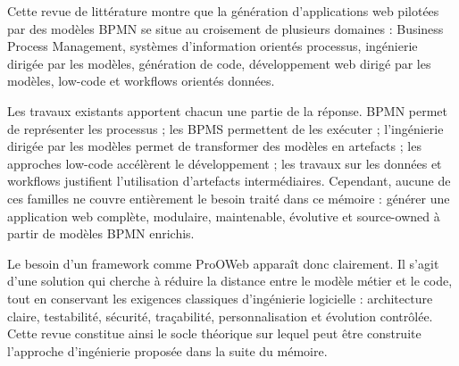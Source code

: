 \documentclass[12pt,a4paper]{article}
\begin{document}
Cette revue de littérature montre que la génération d'applications web pilotées par des modèles BPMN se situe au croisement de plusieurs domaines : Business Process Management, systèmes d'information orientés processus, ingénierie dirigée par les modèles, génération de code, développement web dirigé par les modèles, low-code et workflows orientés données.

Les travaux existants apportent chacun une partie de la réponse. BPMN permet de représenter les processus ; les BPMS permettent de les exécuter ; l'ingénierie dirigée par les modèles permet de transformer des modèles en artefacts ; les approches low-code accélèrent le développement ; les travaux sur les données et workflows justifient l'utilisation d'artefacts intermédiaires. Cependant, aucune de ces familles ne couvre entièrement le besoin traité dans ce mémoire : générer une application web complète, modulaire, maintenable, évolutive et source-owned à partir de modèles BPMN enrichis.

Le besoin d'un framework comme ProOWeb apparaît donc clairement. Il s'agit d'une solution qui cherche à réduire la distance entre le modèle métier et le code, tout en conservant les exigences classiques d'ingénierie logicielle : architecture claire, testabilité, sécurité, traçabilité, personnalisation et évolution contrôlée. Cette revue constitue ainsi le socle théorique sur lequel peut être construite l'approche d'ingénierie proposée dans la suite du mémoire.
\end{document}
